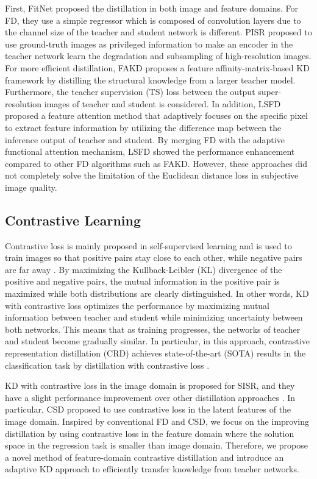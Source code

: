 \documentclass[10pt,twocolumn,letterpaper]{article}
\begin{document}
First, FitNet \cite{fitnet} proposed the distillation in both image and feature domains. For FD, they use a simple regressor which is composed of  convolution layers due to the channel size of the teacher and student network is different. PISR \cite{lee} proposed to use ground-truth images as privileged information to make an encoder in the teacher network learn the degradation and subsampling of high-resolution images. For more efficient distillation, FAKD proposes a feature affinity-matrix-based KD framework by distilling the structural knowledge from a larger teacher model. Furthermore, the teacher supervision (TS) loss between the output super-resolution images of teacher and student is considered. In addition, LSFD proposed a feature attention method that adaptively focuses on the specific pixel to extract feature information by utilizing the difference map between the inference output of teacher and student. By merging FD with the adaptive functional attention mechanism, LSFD showed the performance enhancement compared to other FD algorithms such as FAKD. However, these approaches did not completely solve the limitation of the Euclidean distance loss in subjective image quality.


\subsection{Contrastive Learning}
Contrastive loss is mainly proposed in self-supervised learning \cite{contrastive, adv} and is used to train images so that positive pairs stay close to each other, while negative pairs are far away \cite{crd, csd2021}. By maximizing the Kullback-Leibler (KL) divergence of the positive and negative pairs, the mutual information in the positive pair is maximized while both distributions are clearly distinguished. In other words, KD with contrastive loss optimizes the performance by maximizing mutual information between teacher and student while minimizing uncertainty between both networks. This means that as training progresses, the networks of teacher and student become gradually similar. In particular, in this approach, contrastive representation distillation (CRD) achieves state-of-the-art (SOTA) results in the classification task by distillation with contrastive loss \cite{crd}. 

KD with contrastive loss \cite{srcrd, csd2021} in the image domain is proposed for SISR, and they have a slight performance improvement over other distillation approaches \cite{fakd, lsfd}. In particular, CSD \cite{csd2021} proposed to use contrastive loss in the latent features of the image domain. Inspired by conventional FD and CSD, we focus on the improving distillation by using contrastive loss in the feature domain where the solution space in the regression task is smaller than image domain. Therefore, we propose a novel method of feature-domain contrastive distillation and introduce an adaptive KD approach to efficiently transfer knowledge from teacher networks. 
\end{document}
